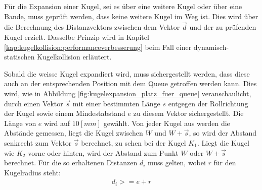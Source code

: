 Für die Expansion einer Kugel, sei es über eine weitere Kugel oder über eine Bande,
muss geprüft werden, dass keine weitere Kugel im Weg ist. Dies wird über die Berechnung
des Distanzvektors zwischen dem Vektor $\vec{d}$ und der zu prüfenden Kugel erzielt. Dasselbe Prinzip wird
in Kapitel \ref{kap:kugelkollision:performanceverbesserung} beim Fall einer dynamisch-statischen Kugelkollision erläutert.


Sobald die weisse Kugel expandiert wird, muss sichergestellt werden, dass diese auch an der entsprechenden Position
mit dem Queue getroffen werden kann. Dies wird, wie in Abbildung \ref{fig:kugelexpansion_platz_fuer_queue} veranschaulicht,
durch einen Vektor $\vec{s}$ mit einer bestimmten Länge $s$ entgegen der Rollrichtung der Kugel sowie einem Mindestabstand
$e$ zu diesem Vektor sichergestellt. Die Länge von $e$ wird auf $10 [mm]$ gewählt. Von jeder Kugel aus
werden die Abstände gemessen, liegt die Kugel zwischen $W$ und $W + \vec{s}$, so wird der Abstand senkrecht zum Vektor $\vec{s}$
berechnet, zu sehen bei der Kugel $K_1$. Liegt die Kugel wie $K_2$ vorne oder hinten, wird der Abstand zum Punkt $W$ oder $W + \vec{s}$
berechnet. Für die so erhaltenen Distanzen $d_i$ muss gelten, wobei $r$ für den Kugelradius steht:
\begin{align}
    d_i >= e + r
\end{align}

